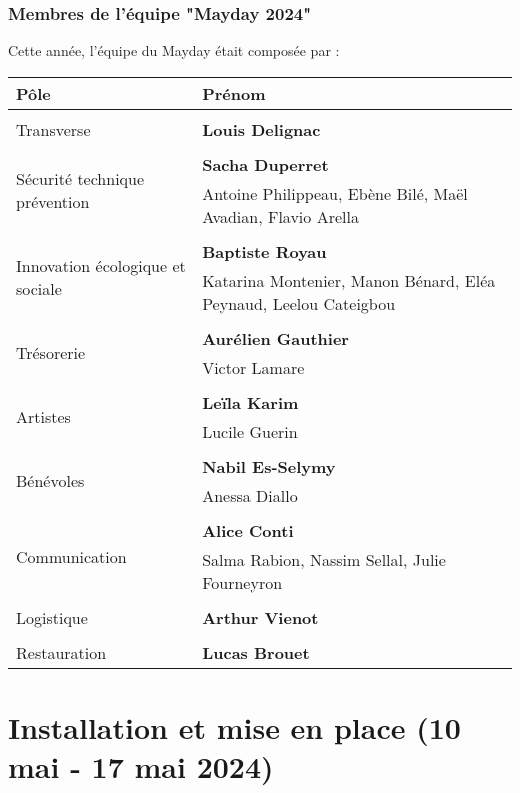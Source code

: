 \documentclass[12pt,a4paper]{report}
\begin{document}
\section{Membres de l'équipe "Mayday 2024"}
Cette année, l'équipe du Mayday était composée par :
\begin{center}
\begin{tabular}{| m{3cm} | m{7cm} |}
\hline
Pôle & Prénom \\ 
 \hline\hline\\
Transverse & \textbf{Louis Delignac}\\ 
\hline\\
\multirow{2}{5em}{Sécurité technique prévention} & \textbf{Sacha Duperret} \\ 
& Antoine Philippeau, Ebène Bilé, Maël Avadian, Flavio Arella\\  
 \hline\\
 \multirow{2}{5em}{Innovation écologique et sociale} & \textbf{Baptiste Royau} \\ 
& Katarina Montenier, Manon Bénard, Eléa Peynaud, Leelou Cateigbou\\
 \hline\\
  \multirow{2}{5em}{Trésorerie} & \textbf{Aurélien Gauthier} \\ 
& Victor Lamare\\
 \hline\\
 \multirow{2}{5em}{ Artistes} & \textbf{Leïla Karim} \\
& Lucile Guerin\\
 \hline\\
\multirow{2}{5em}{Bénévoles} & \textbf{Nabil Es-Selymy} \\ 
& Anessa Diallo\\
 \hline\\
\multirow{2}{5em}{Communication} & \textbf{Alice Conti} \\ 
& Salma Rabion, Nassim Sellal, Julie Fourneyron\\
 \hline\\
 \multirow{1}{5em}{Logistique} & \textbf{Arthur Vienot} \\ 
 \hline\\
 \multirow{1}{5em}{Restauration} & \textbf{Lucas Brouet} \\ 
 \hline
\end{tabular}
\end{center}

\part{Installation et mise en place (10 mai - 17 mai 2024)}
\end{document}

